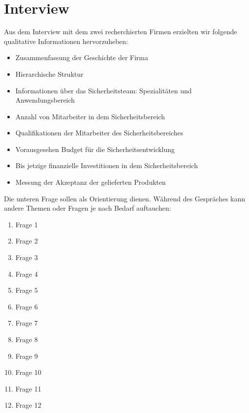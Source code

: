 \section{Interview}\label{appendix:interview}

Aus dem Interview mit dem zwei recherchierten Firmen erzielten wir folgende qualitative Informationen hervorzuheben:

\begin{itemize}
    \item Zusammenfassung der Geschichte der Firma
    \item Hierarchische Struktur
    \item Informationen über das Sicherheitsteam: Spezialitäten und Anwendungsbereich
    \item Anzahl von Mitarbeiter in dem Sicherheitsbereich
    \item Qualifikationen der Mitarbeiter des Sicherheitsbereiches
    \item Vorausgesehen Budget für die Sicherheitsentwicklung
    \item Bis jetzige finanzielle Investitionen in dem Sicherheitsbereich
    \item Messung der Akzeptanz der gelieferten Produkten
\end{itemize}

Die unteren Frage sollen als Orientierung dienen. Während des Gespräches kann andere Themen oder Fragen je nach Bedarf
auftauchen:

\begin{enumerate}
    \item Frage 1
    \item Frage 2
    \item Frage 3
    \item Frage 4
    \item Frage 5    
    \item Frage 6
    \item Frage 7
    \item Frage 8
    \item Frage 9
    \item Frage 10
    \item Frage 11
    \item Frage 12
\end{enumerate}
